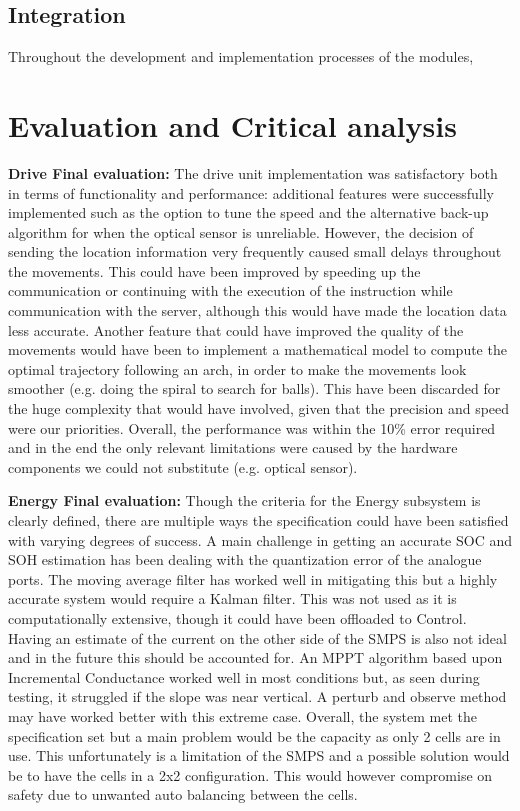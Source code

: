 \documentclass[10pt,twoside]{article}
\begin{document}
\subsection{Integration}
Throughout the development and implementation processes of the modules, 





\newpage
\section{Evaluation and Critical analysis}
\textbf{Drive Final evaluation:} The drive unit implementation was satisfactory both in terms of functionality and performance: additional features were successfully implemented such as the option to tune the speed and the alternative back-up algorithm for when the optical sensor is unreliable. However, the decision of sending the location information very frequently caused small delays throughout the movements. This could have been improved by speeding up the communication or continuing with the execution of the instruction while communication with the server, although this would have made the location data less accurate. Another feature that could have improved the quality of the movements would have been to implement a mathematical model to compute the optimal trajectory following an arch, in order to make the movements look smoother (e.g. doing the spiral to search for balls). This have been discarded for the huge complexity that would have involved, given that the precision and speed were our priorities. Overall, the performance was within the 10\% error required and in the end the only relevant limitations were caused by the hardware components we could not substitute (e.g. optical sensor).

\textbf{Energy Final evaluation:} Though the criteria for the Energy subsystem is clearly defined, there are multiple ways the specification could have been satisfied with varying degrees of success. A main challenge in getting an accurate SOC and SOH estimation has been dealing with the quantization error of the analogue ports. The moving average filter has worked well in mitigating this but a highly accurate system would require a Kalman filter. This was not used as it is computationally extensive, though it could have been offloaded to Control. Having an estimate of the current on the other side of the SMPS is also not ideal and in the future this should be accounted for. An MPPT algorithm based upon Incremental Conductance worked well in most conditions but, as seen during testing, it struggled if the slope was near vertical. A perturb and observe method may have worked better with this extreme case. Overall, the system met the specification set but a main problem would be the capacity as only 2 cells are in use. This unfortunately is a limitation of the SMPS and a possible solution would be to have the cells in a 2x2 configuration. This would however compromise on safety due to unwanted auto balancing between the cells. 
\end{document}

